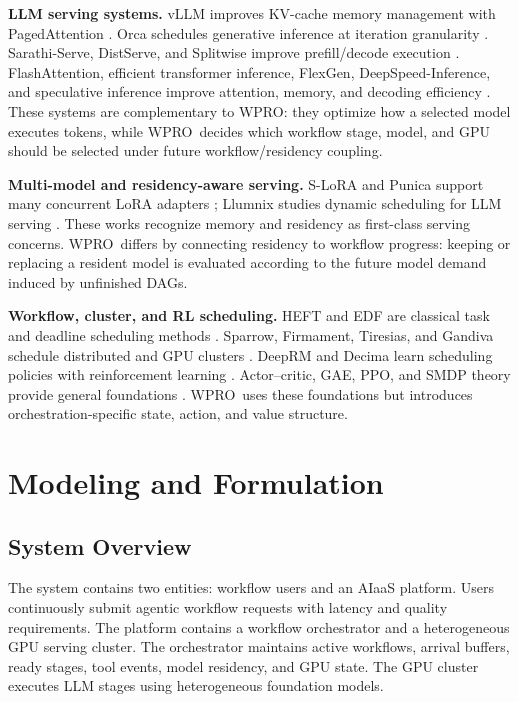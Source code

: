 \documentclass[10pt,conference]{IEEEtran}
\newcommand{\WPRO}{\textsc{WPRO}}
\begin{document}
\textbf{LLM serving systems.}
vLLM improves KV-cache memory management with PagedAttention \cite{kwon2023vllm}. Orca schedules generative inference at iteration granularity \cite{yu2022orca}. Sarathi-Serve, DistServe, and Splitwise improve prefill/decode execution \cite{agrawal2024sarathi,zhong2024distserve,patel2024splitwise}. FlashAttention, efficient transformer inference, FlexGen, DeepSpeed-Inference, and speculative inference improve attention, memory, and decoding efficiency \cite{dao2022flashattention,pope2023efficiently,sheng2023flexgen,aminabadi2022deepspeed,miao2023specinfer}. These systems are complementary to \WPRO: they optimize how a selected model executes tokens, while \WPRO\ decides which workflow stage, model, and GPU should be selected under future workflow/residency coupling.

\textbf{Multi-model and residency-aware serving.}
S-LoRA and Punica support many concurrent LoRA adapters \cite{sheng2023slora,chen2023punica}; Llumnix studies dynamic scheduling for LLM serving \cite{sun2024llumnix}. These works recognize memory and residency as first-class serving concerns. \WPRO\ differs by connecting residency to workflow progress: keeping or replacing a resident model is evaluated according to the future model demand induced by unfinished DAGs.

\textbf{Workflow, cluster, and RL scheduling.}
HEFT and EDF are classical task and deadline scheduling methods \cite{topcuoglu2002heft,liu1973scheduling}. Sparrow, Firmament, Tiresias, and Gandiva schedule distributed and GPU clusters \cite{ousterhout2013sparrow,gog2016firmament,gu2019tiresias,xiao2018gandiva}. DeepRM and Decima learn scheduling policies with reinforcement learning \cite{mao2016deeprm,mao2019decima}. Actor--critic, GAE, PPO, and SMDP theory provide general foundations \cite{mnih2016asynchronous,schulman2016gae,schulman2017ppo,puterman1994mdp,sutton2018reinforcement}. \WPRO\ uses these foundations but introduces orchestration-specific state, action, and value structure.

\section{Modeling and Formulation}

\subsection{System Overview}

The system contains two entities: workflow users and an AIaaS platform. Users continuously submit agentic workflow requests with latency and quality requirements. The platform contains a workflow orchestrator and a heterogeneous GPU serving cluster. The orchestrator maintains active workflows, arrival buffers, ready stages, tool events, model residency, and GPU state. The GPU cluster executes LLM stages using heterogeneous foundation models.
\end{document}
